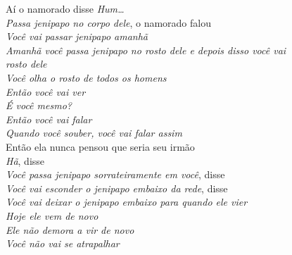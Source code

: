 \noindent Aí o namorado disse \textit{Hum\ldots{}}\\
\textit{Passa jenipapo no corpo dele}, o namorado falou\\
\textit{Você vai passar jenipapo amanhã}\\
\textit{Amanhã você passa jenipapo no rosto dele e depois disso você vai\\
rosto dele}\\
\textit{Você olha o rosto de todos os homens}\\
\textit{Então você vai ver}\\
\textit{É você mesmo?}\\
\textit{Então você vai falar}\\
\textit{Quando você souber, você vai falar assim}\\
Então ela nunca pensou que seria seu irmão\\
\textit{Hã}, disse\\
\textit{Você passa jenipapo sorrateiramente em você}, disse\\
\textit{Você vai esconder o jenipapo embaixo da rede}, disse\\
\textit{Você vai deixar o jenipapo embaixo para quando ele vier}\\
\textit{Hoje ele vem de novo}\\
\textit{Ele não demora a vir de novo}\\
\textit{Você não vai se atrapalhar}

